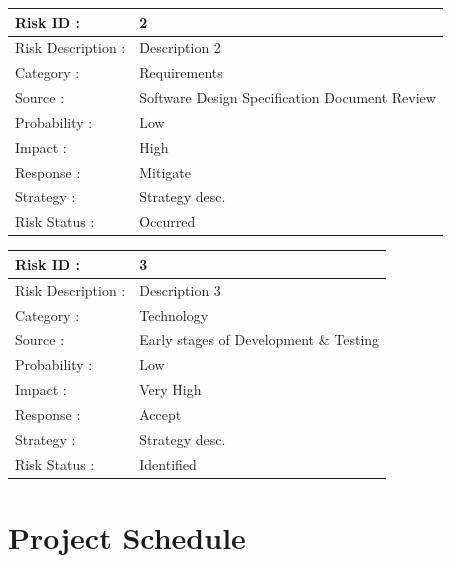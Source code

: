\documentclass{report} %
\begin{document}
			\begin{table}[H]
				\centering
				\renewcommand{\arraystretch}{1.5}
				\begin{tabular}{|l|p{8cm}|}
					\hline
					Risk ID : & 2 \\
					\hline
					Risk Description : & Description 2 \\
					\hline
					Category : & Requirements \\
					\hline
					Source : & Software Design Specification Document Review \\
					\hline
					Probability : & Low \\
					\hline
					Impact : & High \\
					\hline
					Response : & Mitigate \\
					\hline
					Strategy : & Strategy desc. \\
					\hline
					Risk Status : & Occurred \\
					\hline
				\end{tabular}
			\end{table}
		
			\begin{table}[H]
				\centering
				\renewcommand{\arraystretch}{1.5}
				\begin{tabular}{|l|p{8cm}|}
					\hline
					Risk ID : & 3 \\
					\hline
					Risk Description : & Description 3 \\
					\hline
					Category : & Technology \\
					\hline
					Source : & Early stages of Development \& Testing \\
					\hline
					Probability : & Low \\
					\hline
					Impact : & Very High \\
					\hline
					Response : & Accept \\
					\hline
					Strategy : & Strategy desc. \\
					\hline
					Risk Status : & Identified \\
					\hline
				\end{tabular}
			\end{table}
		
		\section{Project Schedule}
		
\end{document}
